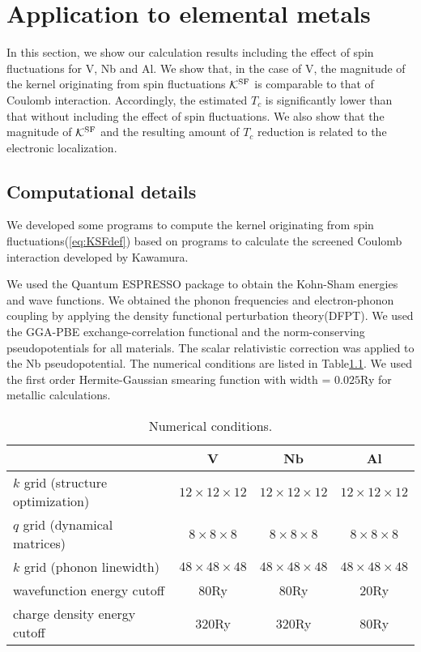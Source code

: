 

%
%
\chapter{Application to elemental metals}
\label{application}
In this section, we show our calculation results including the effect of spin fluctuations 
for V, Nb and Al. We show that, in the case of V, the magnitude of the kernel originating 
from spin fluctuations $\mathcal K^{\rm SF}$ is comparable to that of Coulomb interaction.
Accordingly, the estimated $T_{c}$ is significantly lower than that without including the
effect of spin fluctuations. We also show that the magnitude of $\mathcal K^{\rm SF}$ and the 
resulting amount of $T_{c}$ reduction is related to the electronic localization.

\section{Computational details}
We developed some programs to compute the kernel originating from spin fluctuations(\ref{eq:KSFdef}) 
based on programs to calculate the screened Coulomb interaction 
developed by Kawamura\cite{KMurl,Kawamura2016}.

We used the Quantum ESPRESSO package\cite{QE} to obtain the Kohn-Sham energies and wave functions.
We obtained the phonon frequencies and electron-phonon coupling by applying the density functional
perturbation theory(DFPT)\cite{DFPT}.
We used the GGA-PBE exchange-correlation functional\cite{GGAPBE} and the norm-conserving 
pseudopotentials\cite{normcons} for all materials. 
The scalar relativistic correction was applied to the Nb pseudopotential.
The numerical conditions are listed in Table\ref{tab:numcond}.
We used the first order Hermite-Gaussian smearing function\cite{Paxton1989} 
with width = $0.025$Ry for metallic calculations.

\begin{table}[hbtp]
	\centering
	\caption{Numerical conditions.}
	\begin{tabular}{lccc}
		\hline \hline
		& V & Nb & Al \\
		\hline
	$k$ grid (structure optimization) & $12\times12\times12$ & $12\times12\times12$ & $12\times12\times12$ \\
	$q$ grid (dynamical matrices) & $ 8\times8\times8$ & $8\times8\times8$ & $8\times8\times8$ \\
	$k$ grid (phonon linewidth) & $48\times48\times48$ & $48\times48\times48$ & $48\times48\times48$ \\
	wavefunction energy cutoff & 80Ry & 80Ry & 20Ry \\
	charge density energy cutoff & 320Ry & 320Ry & 80Ry \\
	\hline \hline
	\end{tabular}
	\label{tab:numcond}
\end{table}

